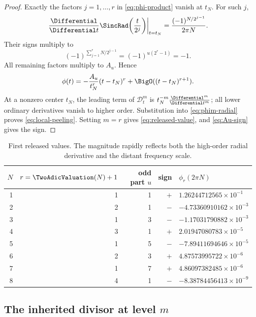 \documentclass[11pt,oneside]{article}
\theoremstyle{definition}
\theoremstyle{remark}
\newcommand{\Dop}{\mathscr D}
\begin{document}
\begin{proof}
Exactly the factors $j=1,\ldots,r$ in \eqref{eq:phi-product} vanish at $t_N$.
For such $j$,
\begin{equation}
 \left.\frac{\Differential}{\Differential t}
 \SincRad\!\left(\frac{t}{2^j}\right)\right|_{t=t_N}
 =\frac{(-1)^{N/2^{j-1}}}{2\pi N}.                 \label{eq:zero-factor-derivative}
\end{equation}
Their signs multiply to
\[
 (-1)^{\sum_{j=1}^rN/2^{j-1}}
 =(-1)^{u(2^r-1)}=-1.
\]
All remaining factors multiply to $A_u$.  Hence
\begin{equation}
 \phi(t)=-\frac{A_u}{t_N^r}(t-t_N)^r
          +\BigO((t-t_N)^{r+1}).                    \label{eq:base-local-zero}
\end{equation}
At a nonzero center $t_N$, the leading term of $\Dop_t^m$ is
$t_N^{-m}\frac{\Differential^m}{\Differential t^m}$; all lower ordinary derivatives vanish to
higher order.  Substitution into \eqref{eq:phim-radial} proves
\eqref{eq:local-peeling}.  Setting $m=r$ gives
\eqref{eq:released-value}, and \eqref{eq:Au-sign} gives the sign.
\end{proof}

\begin{table}[ht]
\centering
\caption{First released values.  The magnitude rapidly reflects both the
high-order radial derivative and the distant frequency scale.}
\label{tab:release-values}
\small
\begin{tabular}{@{}rrrrl@{}}
\toprule
$N$ & $r=\TwoAdicValuation(N)+1$ & odd part $u$ & sign & $\phi_r(2\pi N)$ \\
\midrule
1 & 1 & 1 & $+$ & $1.26244712565\times10^{-1}$ \\
2 & 2 & 1 & $-$ & $-4.73360910162\times10^{-3}$ \\
3 & 1 & 3 & $-$ & $-1.17031790882\times10^{-3}$ \\
4 & 3 & 1 & $+$ & $2.01947080783\times10^{-5}$ \\
5 & 1 & 5 & $-$ & $-7.89411694646\times10^{-5}$ \\
6 & 2 & 3 & $+$ & $4.87573995722\times10^{-6}$ \\
7 & 1 & 7 & $+$ & $4.86097382485\times10^{-6}$ \\
8 & 4 & 1 & $-$ & $-8.38784456413\times10^{-9}$ \\
\bottomrule
\end{tabular}
\end{table}

\subsection{The inherited divisor at level \texorpdfstring{$m$}{m}}
\end{document}
